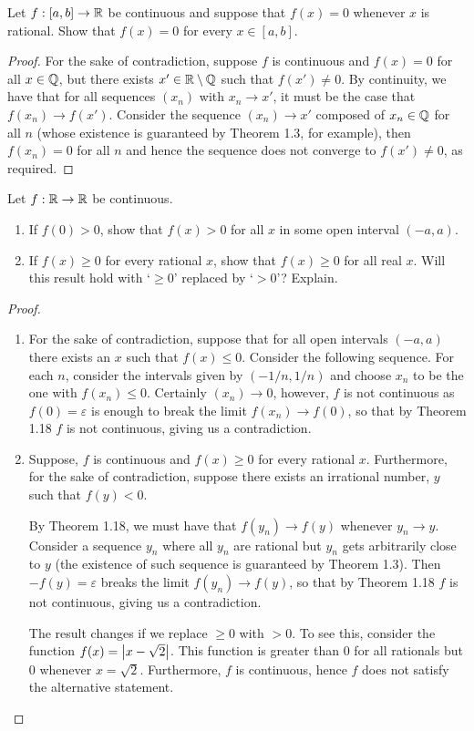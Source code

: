 \begin{exercise}{45}
Let $f:[a,b]\to\mathbb{R}$ be continuous and suppose that $f(x)=0$ whenever $x$ is rational. Show that $f(x)=0$ for every $x\in[a,b]$.
\end{exercise}
\begin{proof}
For the sake of contradiction, suppose $f$ is continuous and $f(x)=0$ for all $x\in\mathbb{Q}$, but there exists $x'\in\mathbb{R}\setminus\mathbb{Q}$ such that $f(x')\neq 0$. By continuity, we have that for all sequences $(x_n)$ with $x_n\to x'$, it must be the case that $f(x_n)\to f(x')$. Consider the sequence $(x_n)\to x'$ composed of $x_n\in\mathbb{Q}$ for all $n$ (whose existence is guaranteed by Theorem 1.3, for example), then $f(x_n)=0$ for all $n$ and hence the sequence does not converge to $f(x')\neq 0$, as required.
\end{proof}

\begin{exercise}{46}
Let $f:\mathbb{R}\to\mathbb{R}$ be continuous.
\begin{enumerate}
    \item If $f(0)>0$, show that $f(x)>0$ for all $x$ in some open interval $(-a,a)$.
    \item If $f(x)\geq 0$ for every rational $x$, show that $f(x)\geq 0$ for all real $x$. Will this result hold with `$\geq 0$' replaced by `$>0$'? Explain.
\end{enumerate}
\end{exercise}
\begin{proof}
\begin{enumerate}
    \item For the sake of contradiction, suppose that for all open intervals $(-a,a)$ there exists an $x$ such that $f(x)\leq 0$. Consider the following sequence. For each $n$, consider the intervals given by $(-1/n,1/n)$ and choose $x_n$ to be the one with $f(x_n)\leq 0$. Certainly $(x_n)\to 0$, however, $f$ is not continuous as $f(0)=\varepsilon$ is enough to break the limit $f(x_n)\to f(0)$, so that by Theorem 1.18 $f$ is not continuous, giving us a contradiction. 
    \item Suppose, $f$ is continuous and $f(x)\geq 0$ for every rational $x$. Furthermore, for the sake of contradiction, suppose there exists an irrational number, $y$ such that $f(y)<0$.

    By Theorem 1.18, we must have that $f(y_n)\to f(y)$ whenever $y_n\to y$. Consider a sequence $y_n$ where all $y_n$ are rational but $y_n$ gets arbitrarily close to $y$ (the existence of such sequence is guaranteed by Theorem 1.3). Then $-f(y)=\varepsilon$ breaks the limit $f(y_n)\to f(y)$, so that by Theorem 1.18 $f$ is not continuous, giving us a contradiction.

    The result changes if we replace $\geq 0$ with $>0$. To see this, consider the function $f(x)=\left\lvert x-\sqrt{2}\right\rvert$. This function is greater than 0 for all rationals but 0 whenever $x=\sqrt{2}$. Furthermore, $f$ is continuous, hence $f$ does not satisfy the alternative statement.
\end{enumerate}
\end{proof}

